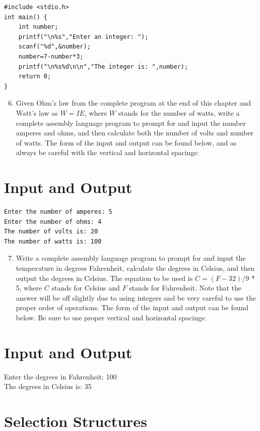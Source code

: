 \documentclass[10pt]{article}
\begin{document}
\begin{verbatim}
#include <stdio.h>
int main() {
    int number;
    printf("\n%s","Enter an integer: ");
    scanf("%d",&number);
    number=7-number*3;
    printf("\n%s%d\n\n","The integer is: ",number);
    return 0;
}
\end{verbatim}

\begin{enumerate}
  \setcounter{enumi}{5}
  \item Given Ohm's law from the complete program at the end of this chapter and Watt's law as $W=I E$, where $W$ stands for the number of watts, write a complete assembly language program to prompt for and input the number amperes and ohms, and then calculate both the number of volts and number of watts. The form of the input and output can be found below, and as always be careful with the vertical and horizontal spacings:
\end{enumerate}

\section*{Input and Output}
\begin{verbatim}
Enter the number of amperes: 5
Enter the number of ohms: 4
The number of volts is: 20
The number of watts is: 100
\end{verbatim}

\begin{enumerate}
  \setcounter{enumi}{6}
  \item Write a complete assembly language program to prompt for and input the temperature in degrees Fahrenheit, calculate the degrees in Celsius, and then output the degrees in Celsius. The equation to be used is $C=(F-32) / 9$ * 5, where $C$ stands for Celsius and $F$ stands for Fahrenheit. Note that the answer will be off slightly due to using integers and be very careful to use the proper order of operations. The form of the input and output can be found below. Be sure to use proper vertical and horizontal spacings:
\end{enumerate}

\section*{Input and Output}
Enter the degrees in Fahrenheit: 100\\
The degrees in Celsius is: 35

\section*{Selection Structures}
\end{document}
